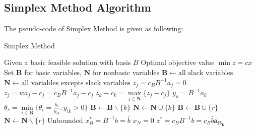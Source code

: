 			\subsection{Simplex Method Algorithm}
				The pseudo-code of Simplex Method is given as following:
				\begin{algorithm}[h!]
					\caption{Simplex Method}
					\begin{algorithmic}[1]
						\REQUIRE Given a basic feasible solution with basis $B$
						\ENSURE Optimal objective value $\min z= cx$
						\STATE Set $\mathbf{B}$ for basic variables, $\mathbf{N}$ for nonbasic variables
						\STATE $\mathbf{B} \gets \text{all slack variables}$
						\STATE $\mathbf{N} \gets \text{all variables excepts slack variables}$
							\STATE $z_j=c_BB^{-1}a_j=0$
						\ENDFOR
							\STATE $z_j=wa_j-c_j=c_BB^{-1}a_j-c_j$
							\STATE $z_k-c_k=\max\limits_{j \in \mathbf{N}}\{z_j-c_j\}$
							\STATE $y_k=B^{-1}a_k$
								\STATE $\theta_r=\min\limits_{i \in \mathbf{B}}\{\theta_i=\frac{\bar{b}_i}{y_{ik}}:y_{ik}>0\}$
								\STATE $\mathbf{B} \gets \mathbf{B} \backslash \{k\}$
								\STATE $\mathbf{N} \gets \mathbf{N} \cup \{k\}$
								\STATE $\mathbf{B} \gets \mathbf{B} \cup \{r\}$
								\STATE $\mathbf{N} \gets \mathbf{N} \backslash \{r\}$
							\ELSE
								\STATE Unbounded
							\ENDIF
						\ENDWHILE
						\STATE $x_B^*=B^{-1}b=\bar{b}$
						\STATE $x_N=0$
						\STATE $z^*=c_BB^{-1}b=c_B\bar{b}\mathbf{a_{B_k}}$
					\end{algorithmic}
				\end{algorithm}

